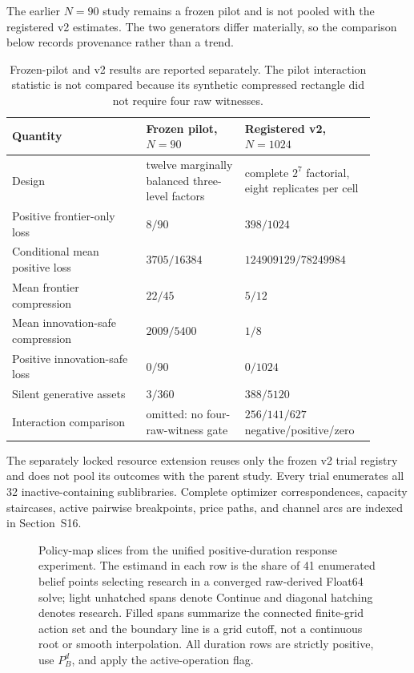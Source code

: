 The earlier \(N=90\) study remains a frozen pilot and is not pooled with the
registered v2 estimates.  The two generators differ materially, so the
comparison below records provenance rather than a trend.

\begin{table}[htbp]
\centering
\scriptsize
\begin{tabular}{@{}
  p{0.34\linewidth}
  >{\centering\arraybackslash}p{0.25\linewidth}
  >{\centering\arraybackslash}p{0.31\linewidth}@{}}
\toprule
Quantity & Frozen pilot, \(N=90\) & Registered v2, \(N=1024\)\\
\midrule
Design & twelve marginally balanced three-level factors &
complete \(2^7\) factorial, eight replicates per cell\\
Positive frontier-only loss & \(8/90\) & \(398/1024\)\\
Conditional mean positive loss & \(3705/16384\) &
\(124909129/78249984\)\\
Mean frontier compression & \(22/45\) & \(5/12\)\\
Mean innovation-safe compression & \(2009/5400\) & \(1/8\)\\
Positive innovation-safe loss & \(0/90\) & \(0/1024\)\\
Silent generative assets & \(3/360\) & \(388/5120\)\\
Interaction comparison & omitted: no four-raw-witness gate &
\(256/141/627\) negative/positive/zero\\
\bottomrule
\end{tabular}
\caption{Frozen-pilot and v2 results are reported separately.  The pilot
interaction statistic is not compared because its synthetic compressed
rectangle did not require four raw witnesses.}
\label{tab:supp-randomized-pilot-comparison}
\end{table}

The separately locked resource extension reuses only the frozen v2 trial
registry and does not pool its outcomes with the parent study.  Every trial
enumerates all 32 inactive-containing sublibraries.  Complete optimizer
correspondences, capacity staircases, active pairwise breakpoints, price paths,
and channel arcs are indexed in Section~S16.

\begin{figure}[htbp]
  \centering
  
  \caption{Policy-map slices from the unified positive-duration response
  experiment.  The estimand in each row is the share of 41 enumerated belief
  points selecting research in a converged raw-derived Float64 solve; light
  unhatched spans denote Continue and diagonal hatching denotes research.
  Filled spans summarize the
  connected finite-grid action set and the boundary line is a grid cutoff,
  not a continuous root or smooth interpolation.  All duration rows are
  strictly positive, use \(P_B^d\), and apply the active-operation flag.}
  \label{fig:supp-dynamic-research-policy-regions}
\end{figure}

\clearpage
